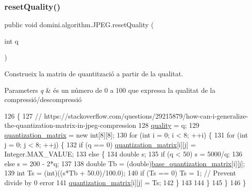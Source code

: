\subsubsection{\texorpdfstring{reset\+Quality()}{resetQuality()}}
{\footnotesize\ttfamily public void domini.\+algorithm.\+J\+P\+E\+G.\+reset\+Quality (\begin{DoxyParamCaption}\item[{int}]{q }\end{DoxyParamCaption})\hspace{0.3cm}{\ttfamily [inline]}}



Construeix la matriu de quantització a partir de la qualitat. 


\begin{DoxyParams}{Parameters}
{\em q} & és un número de 0 a 100 que expressa la qualitat de la compressió/descompressió \\
\hline
\end{DoxyParams}

\begin{DoxyCode}
126                                     \{
127         \textcolor{comment}{//
       https://stackoverflow.com/questions/29215879/how-can-i-generalize-the-quantization-matrix-in-jpeg-compression}
128         \hyperlink{classdomini_1_1algorithm_1_1JPEG_ae80176d5ff56e613643db55e21c513da}{quality} = q;
129         \hyperlink{classdomini_1_1algorithm_1_1JPEG_a7c95eb140dbe185a31b402d48ec17a66}{quantization\_matrix} = \textcolor{keyword}{new} \textcolor{keywordtype}{int}[8][8];
130         \textcolor{keywordflow}{for} (\textcolor{keywordtype}{int} i = 0; i < 8; ++i) \{
131             \textcolor{keywordflow}{for} (\textcolor{keywordtype}{int} j = 0; j < 8; ++j) \{
132                 \textcolor{keywordflow}{if} (q == 0) \hyperlink{classdomini_1_1algorithm_1_1JPEG_a7c95eb140dbe185a31b402d48ec17a66}{quantization\_matrix}[i][j] = Integer.MAX\_VALUE;
133                 \textcolor{keywordflow}{else} \{
134                     \textcolor{keywordtype}{double} s;
135                     \textcolor{keywordflow}{if} (q < 50) s = 5000/q;
136                     \textcolor{keywordflow}{else} s = 200 - 2*q;
137 
138                     \textcolor{keywordtype}{double} Tb = (double)\hyperlink{classdomini_1_1algorithm_1_1JPEG_a1f91c0bad6cfd3ac22bec68bc28564c5}{base\_quantization\_matrix}[i][j];
139                     \textcolor{keywordtype}{int} Ts = (int)((s*Tb + 50.0)/100.0);
140                     \textcolor{keywordflow}{if} (Ts == 0) Ts = 1; \textcolor{comment}{// Prevent divide by 0 error}
141                     \hyperlink{classdomini_1_1algorithm_1_1JPEG_a7c95eb140dbe185a31b402d48ec17a66}{quantization\_matrix}[i][j] = Ts;
142                 \}
143 
144             \}
145         \}
146     \}
\end{DoxyCode}
\mbox{\label{classdomini_1_1algorithm_1_1JPEG_aa9c52789d61d5eebdeb13ee39f8e817d}} 
